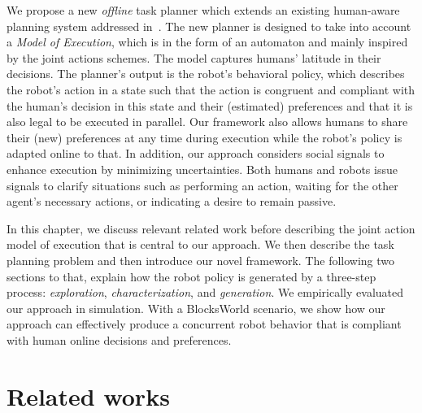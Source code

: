 We propose a new \textit{offline} task planner which extends an existing human-aware planning system addressed in~\cite{buisan_hatpehda_icra}. 
The new planner is designed to take into account a \textit{Model of Execution}, which is in the form of an automaton and mainly inspired by the joint actions schemes. 
The model captures humans' latitude in their decisions. 
The planner's output is the robot's behavioral policy, which describes the robot's action in a state such that the action is congruent and compliant with the human's decision in this state and their (estimated) preferences and that it is also legal to be executed in parallel. 
Our framework also allows humans to share their (new) preferences at any time during execution while the robot's policy is adapted online to that. 
In addition, our approach considers social signals to enhance execution by minimizing uncertainties. Both humans and robots issue signals to clarify situations such as performing an action, waiting for the other agent's necessary actions, or indicating a desire to remain passive.

In this chapter, we discuss relevant related work before describing the joint action model of execution that is central to our approach. 
We then describe the task planning problem and then introduce our novel framework. 
The following two sections to that, explain how the robot policy is generated by a three-step process: \textit{exploration}, \textit{characterization}, and \textit{generation}. 
We empirically evaluated our approach in simulation. With a BlocksWorld scenario, we show how our approach can effectively produce a concurrent robot behavior that is compliant with human online decisions and preferences.  

\section{Related works}

